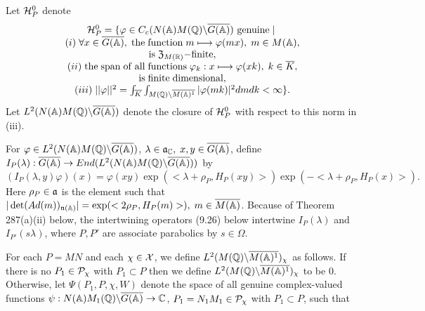 Let ${\cal H}_P^0$ denote 
\begin{equation}
\begin{array}{c}
{\cal H}_P^0
=\{\varphi \in
C_c(N({\Bbb{A}})M({\Bbb{Q}})\backslash \overline{G({\Bbb{A}})})
\ {\rm genuine}\;|\; \\ 
(i)\;\forall x\in \overline{G({\Bbb{A}})},
\;{\rm the\;function}\;m\longmapsto \varphi (mx),
\;m\in M({\Bbb{A}}), \\ 
{\rm is}\;{\frak{Z}}_{M({\Bbb{R}})}{\rm -finite}, \\ 
(ii)\;{\rm the\;span\;of\;all\;functions}
\;\varphi _k:x\longmapsto \varphi (xk),\;k\in \overline{K}, \\ 
{\rm is\;finite\;}\text{{\rm dimensional}}, \\ 
(iii)\;||\varphi ||^2=
\int_{\overline{K}}
\int_{M({\Bbb{Q}})\backslash \overline{M({\Bbb{A}})^1}}
|\varphi (mk)|^2dmdk<\infty \} .
\end{array}
\end{equation}
Let $L^2(N({\Bbb{A}})M({\Bbb{Q}})\backslash \overline{G({\Bbb{A}})})$
denote the closure of ${\cal H}_P^0$ with respect to this
norm in (iii).

For $\varphi \in
L^2(N({\Bbb{A}})M({\Bbb{Q}})\backslash \overline{G({\Bbb{A}})})$,
$\lambda \in {\frak{a}}_{{\Bbb C}},\;x,y\in \overline{G({\Bbb{A}})}$,
define $I_P(\lambda ):\overline{G({\Bbb{A}})}\rightarrow
End(L^2(N({\Bbb{A}})M({\Bbb{Q}})\backslash \overline{G({\Bbb{A}})}))$ by 
\[
(I_P(\lambda ,y)\varphi )(x)=\varphi (xy)\exp (<\lambda +\rho
_P,H_P(xy)>)\exp (-<\lambda +\rho _P,H_P(x)>). 
\]
Here $\rho _P\in {\frak{a}}$ is the element such that
$|\det (Ad(m))_{{\frak{n}}({\Bbb A})}|
=\exp (<2\rho _P,H_P(m)>),\;m\in \overline{M({\Bbb{A}})}$.
Because of Theorem 287(a)(ii) below, the intertwining operators
(9.26) below intertwine $I_P(\lambda)$ and $I_{P'}(s\lambda)$,
where $P,P'$ are associate parabolics by $s\in \Omega$.

For each $P=MN$ and each $\chi \in {\cal X}$, we define
$L^2(M({\Bbb{Q}})\backslash \overline{M({\Bbb{A}})^1})_\chi $
as follows. If there is no $P_1\in {\cal P}_\chi $
with $P_1\subset P$ then we define
$L^2(M({{\Bbb{Q}}})\backslash \overline{M({\Bbb{A}})^1})_\chi $
to be $0$. Otherwise, let $\Psi (P_1,P,\chi,W )$ denote the space of
all genuine complex-valued functions
$\psi :N({\Bbb{A}})M_1({\Bbb{Q}})\backslash \overline{G({\Bbb{A}})}
\rightarrow {\Bbb C}$, $P_1=N_1M_1\in {\cal{P}}_\chi $ 
with $P_1\subset P$, such that

